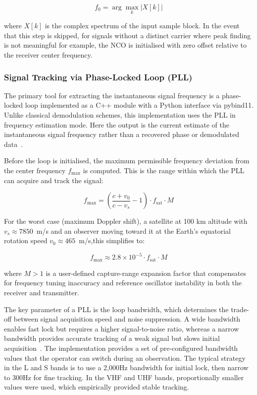 \documentclass[lineno,pdflatex,sn-basic,referee,]{sn-jnl}
\begin{document}
\begin{equation}
    f_0 = \arg\max_k |X[k]|
    \label{eq:fft-init}
\end{equation}

\noindent
where $X[k]$ is the complex spectrum of the input sample block. In the event that this step is skipped, for signals without a distinct carrier where peak finding is not meaningful for example, the NCO is initialised with zero offset relative to the receiver center frequency.

\subsubsection{Signal Tracking via Phase-Locked Loop (PLL)}
\label{subsubsec:pll-tracking}

The primary tool for extracting the instantaneous signal frequency is a phase-locked loop implemented as a C++ module with a Python interface via pybind11. Unlike classical demodulation schemes, this implementation uses the PLL in frequency estimation mode. Here the output is the current estimate of the instantaneous signal frequency rather than a recovered phase or demodulated data~\citep{guo2015, gao2016}.

Before the loop is initialised, the maximum permissible frequency deviation from the center frequency $f_{\max}$ is computed. This is the range within which the PLL can acquire and track the signal:

\begin{equation}
    f_{\max} = \left(\frac{c + v_0}{c - v_s} - 1\right) \cdot f_{\mathrm{sat}} \cdot M
    \label{eq:fmax}
\end{equation}

\noindent
For the worst case (maximum Doppler shift), a satellite at 100 km altitude with $v_s \approx 7850$~m/s and an observer moving toward it at the Earth's equatorial rotation speed $v_0 \approx 465$~m/s,this simplifies to:

\begin{equation}
    f_{\max} \approx 2.8 \times 10^{-5} \cdot f_{\mathrm{sat}} \cdot M
    \label{eq:fmax-approx}
\end{equation}

\noindent
where $M > 1$ is a user-defined capture-range expansion factor that compensates for frequency tuning inaccuracy and reference oscillator instability in both the receiver and transmitter.

The key parameter of a PLL is the loop bandwidth, which determines the trade-off between signal acquisition speed and noise suppression. A wide bandwidth enables fast lock but requires a higher signal-to-noise ratio, whereas a narrow bandwidth provides accurate tracking of a weak signal but slows initial acquisition~\citep{guo2015}. The implementation provides a set of pre-configured bandwidth values that the operator can switch during an observation. The typical strategy in the L and S bands is to use a 2,000Hz bandwidth for initial lock, then narrow to 300Hz for fine tracking. In the VHF and UHF bands, proportionally smaller values were used, which empirically provided stable tracking.
\end{document}
